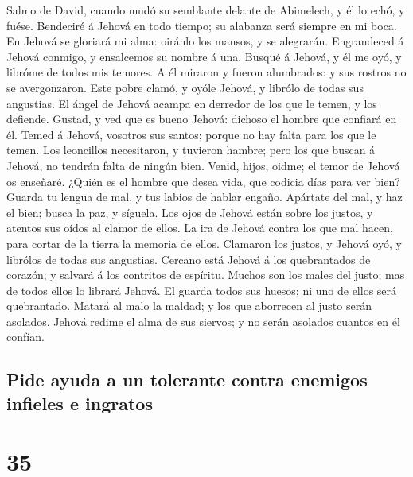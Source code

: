  Salmo de David, cuando mudó su semblante delante de
Abimelech, y él lo echó, y fuése. Bendeciré á Jehová en todo tiempo; su
alabanza será siempre en mi boca.  En Jehová se gloriará
mi alma: oiránlo los mansos, y se alegrarán.  Engrandeced
á Jehová conmigo, y ensalcemos su nombre á una.  Busqué á
Jehová, y él me oyó, y libróme de todos mis temores.  A él
miraron y fueron alumbrados: y sus rostros no se avergonzaron.
 Este pobre clamó, y oyóle Jehová, y librólo de todas sus
angustias.  El ángel de Jehová acampa en derredor de los
que le temen, y los defiende.  Gustad, y ved que es bueno
Jehová: dichoso el hombre que confiará en él.  Temed á
Jehová, vosotros sus santos; porque no hay falta para los que le temen.
 Los leoncillos necesitaron, y tuvieron hambre; pero los
que buscan á Jehová, no tendrán falta de ningún bien. 
Venid, hijos, oidme; el temor de Jehová os enseñaré. 
¿Quién es el hombre que desea vida, que codicia días para ver bien?
 Guarda tu lengua de mal, y tus labios de hablar engaño.
 Apártate del mal, y haz el bien; busca la paz, y
síguela.  Los ojos de Jehová están sobre los justos, y
atentos sus oídos al clamor de ellos.  La ira de Jehová
contra los que mal hacen, para cortar de la tierra la memoria de ellos.
 Clamaron los justos, y Jehová oyó, y librólos de todas
sus angustias.  Cercano está Jehová á los quebrantados de
corazón; y salvará á los contritos de espíritu.  Muchos
son los males del justo; mas de todos ellos lo librará Jehová.
 El guarda todos sus huesos; ni uno de ellos será
quebrantado.  Matará al malo la maldad; y los que
aborrecen al justo serán asolados.  Jehová redime el alma
de sus siervos; y no serán asolados cuantos en él confían.

\hypertarget{pide-ayuda-a-un-tolerante-contra-enemigos-infieles-e-ingratos}{%
\subsection{Pide ayuda a un tolerante contra enemigos infieles e
ingratos}\label{pide-ayuda-a-un-tolerante-contra-enemigos-infieles-e-ingratos}}

\hypertarget{section-34}{%
\section{35}\label{section-34}}

